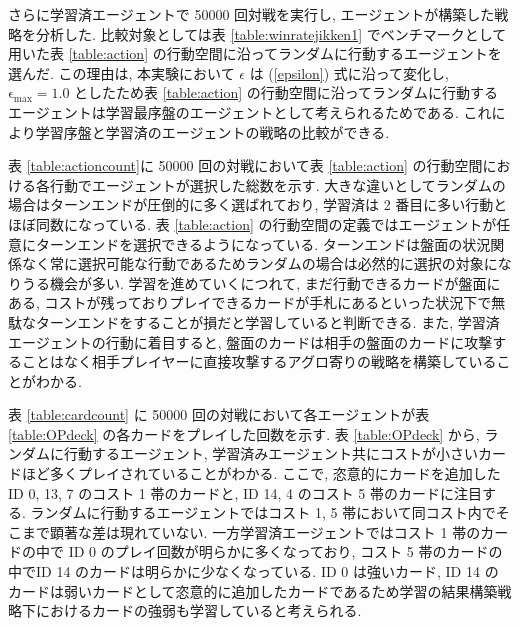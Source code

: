 \documentclass[12pt]{jarticle}
\begin{document}
  さらに学習済エージェントで 50000 回対戦を実行し, エージェントが構築した戦略を分析した. 比較対象としては表 \ref{table:winratejikken1} でベンチマークとして用いた表 \ref{table:action} の行動空間に沿ってランダムに行動するエージェントを選んだ. この理由は, 本実験において $\epsilon$ は (\ref{epsilon}) 式に沿って変化し, $\mathrm{\epsilon_{max}} = 1.0$ としたため表 \ref{table:action} の行動空間に沿ってランダムに行動するエージェントは学習最序盤のエージェントとして考えられるためである. これにより学習序盤と学習済のエージェントの戦略の比較ができる.\par
  表 \ref{table:actioncount}に 50000 回の対戦において表 \ref{table:action} の行動空間における各行動でエージェントが選択した総数を示す. 大きな違いとしてランダムの場合はターンエンドが圧倒的に多く選ばれており, 学習済は 2 番目に多い行動とほぼ同数になっている. 表 \ref{table:action} の行動空間の定義ではエージェントが任意にターンエンドを選択できるようになっている. ターンエンドは盤面の状況関係なく常に選択可能な行動であるためランダムの場合は必然的に選択の対象になりうる機会が多い. 学習を進めていくにつれて, まだ行動できるカードが盤面にある, コストが残っておりプレイできるカードが手札にあるといった状況下で無駄なターンエンドをすることが損だと学習していると判断できる. 
  また, 学習済エージェントの行動に着目すると, 盤面のカードは相手の盤面のカードに攻撃することはなく相手プレイヤーに直接攻撃するアグロ寄りの戦略を構築していることがわかる. \par
  表 \ref{table:cardcount} に 50000 回の対戦において各エージェントが表 \ref{table:OPdeck} の各カードをプレイした回数を示す. 表 \ref{table:OPdeck} から, ランダムに行動するエージェント, 学習済みエージェント共にコストが小さいカードほど多くプレイされていることがわかる. ここで, 恣意的にカードを追加した ID 0, 13, 7 のコスト 1 帯のカードと, ID 14, 4 のコスト 5 帯のカードに注目する. ランダムに行動するエージェントではコスト 1, 5 帯において同コスト内でそこまで顕著な差は現れていない. 一方学習済エージェントではコスト 1 帯のカードの中で ID 0 のプレイ回数が明らかに多くなっており, コスト 5 帯のカードの中でID 14 のカードは明らかに少なくなっている. ID 0 は強いカード, ID 14 のカードは弱いカードとして恣意的に追加したカードであるため学習の結果構築戦略下におけるカードの強弱も学習していると考えられる.
\end{document}
